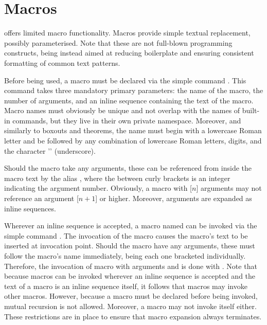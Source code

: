 \section[sec:macros]{Macros}

\lambtex offers limited macro functionality.  Macros provide simple textual replacement,
possibly parameterised.  Note that these are not full-blown programming constructs,
being instead aimed at reducing boilerplate and ensuring consistent formatting of
common text patterns.

Before being used, a macro must be declared via the simple command \mono{\\newmacro}.
This command takes three mandatory primary parameters: the name of the macro, the number
of arguments, and an inline sequence containing the text of the macro.  Macro names
must obviously be unique and not overlap with the names of built-in commands, but they
live in their own private namespace.  Moreover, and similarly to boxouts and theorems,
the name must begin with a lowercase Roman letter and be followed by any combination
of lowercase Roman letters, digits, and the character '\mono{_}' (underscore).

Should the macro take any arguments, these can be referenced from inside the macro
text by the alias , where the  between curly
brackets is an integer indicating the argument number.  Obviously, a macro with [$n$]
arguments may not reference an argument [$n+1$] or higher.  Moreover, arguments are
expanded as inline sequences.

Wherever an inline sequence is accepted, a macro named  can be invoked via
the simple command \mono{\\name}.  The invocation of the macro causes the macro's text
to be inserted at invocation point.  Should the macro have any arguments, these must
follow the macro's name immediately, being each one bracketed individually.  Therefore,
the invocation of macro  with arguments  and 
is done with \mbox{}.  Note that because macros
can be invoked wherever an inline sequence is accepted and the text of a macro is
an inline sequence itself, it follows that macros may invoke other macros.  However,
because a macro must be declared before being invoked, mutual recursion is not allowed.
Moreover, a macro may not invoke itself either.  These restrictions are in place to
ensure that macro expansion always terminates.

